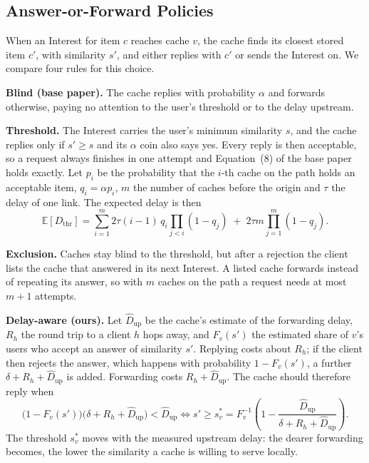\documentclass[11pt,a4paper]{article}
\newcommand{\Dup}{\widehat{D}_{\mathrm{up}}}
\begin{document}
\subsection{Answer-or-Forward Policies}\label{sec:policies}
When an Interest for item $c$ reaches cache $v$, the cache finds its closest stored item $c'$, with
similarity $s'$, and either replies with $c'$ or sends the Interest on. We compare four rules for
this choice.

\textbf{Blind (base paper).} The cache replies with probability $\alpha$ and forwards otherwise,
paying no attention to the user's threshold or to the delay upstream.

\textbf{Threshold.} The Interest carries the user's minimum similarity $s$, and the cache replies only
if $s'\geq s$ and its $\alpha$ coin also says yes. Every reply is then acceptable, so a request always
finishes in one attempt and Equation~(8) of the base paper holds exactly. Let $p_i$ be the
probability that the $i$-th cache on the path holds an acceptable item, $q_i=\alpha p_i$, $m$ the
number of caches before the origin and $\tau$ the delay of one link. The expected delay is then
\begin{equation}
\mathbb{E}[D_{\mathrm{thr}}] = \sum_{i=1}^{m} 2\tau(i-1)\,q_i\prod_{j<i}(1-q_j)
\;+\; 2\tau m\prod_{j=1}^{m}(1-q_j).
\label{eq:threshold-delay}
\end{equation}

\textbf{Exclusion.} Caches stay blind to the threshold, but after a rejection the client lists the
cache that answered in its next Interest. A listed cache forwards instead of repeating its answer, so
with $m$ caches on the path a request needs at most $m+1$ attempts.

\textbf{Delay-aware (ours).} Let $\Dup$ be the cache's estimate of the forwarding delay, $R_h$ the
round trip to a client $h$ hops away, and $F_v(s')$ the estimated share of $v$'s users who accept an
answer of similarity $s'$. Replying costs about $R_h$; if the client then rejects the answer, which
happens with probability $1-F_v(s')$, a further $\delta+R_h+\Dup$ is added. Forwarding costs
$R_h+\Dup$. The cache should therefore reply when
\begin{equation}
\bigl(1-F_v(s')\bigr)\bigl(\delta+R_h+\Dup\bigr)<\Dup
\iff
s'\geq s_v^*=F_v^{-1}\!\left(1-\frac{\Dup}{\delta+R_h+\Dup}\right).
\label{eq:decision-rule}
\end{equation}
The threshold $s_v^*$ moves with the measured upstream delay: the dearer forwarding becomes, the lower
the similarity a cache is willing to serve locally.
\end{document}
